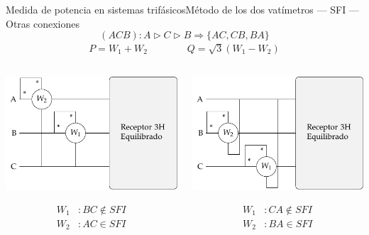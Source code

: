 \documentclass[aspectratio=169, xcolor={usenames,svgnames,dvipsnames}]{beamer}
\begin{document}
\begin{frame}{Medida de potencia en sistemas trifásicos}{Método de los dos vatímetros --- SFI --- Otras conexiones}
\[
  \boxed{(ACB): A \triangleright C \triangleright B \Longrightarrow \{AC, CB, BA\}}
\]
\begin{align*}
  P = W_1 + W_2\qquad \qquad Q = \sqrt{3}(W_1 - W_2)
\end{align*}
\begin{columns}
\begin{column}{0.33\columnwidth}
\begin{center}
\includegraphics[width=.8\linewidth]{../figs/Potencia3H_Equilibrado_AB_SFI.pdf}
\end{center}
\begin{align*}
  W_1&: BC \notin SFI\\
  W_2&: AC \in SFI\\
\end{align*}
\end{column}
\begin{column}{0.33\columnwidth}
\begin{center}
\includegraphics[width=.8\linewidth]{../figs/Potencia3H_Equilibrado_BC_SFI.pdf}
\end{center}
\begin{align*}
  W_1&: CA \notin SFI\\
  W_2&: BA \in SFI\\
\end{align*}
\end{column}


\end{columns}
\end{frame}
\end{document}
